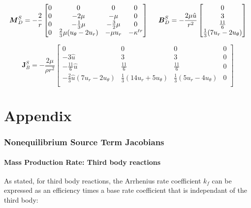 \documentclass[10pt]{article}
\begin{document}
\begin{flushleft}
\begin{equation*}
    \boldsymbol{M}_D^S = -\frac{2}{r}\begin{bmatrix}
        0 & 0 & 0 & 0 \\
        0 & -2 \mu & -\mu & 0 \\
        0 &-\frac{1}{3} \mu & -\frac{3}{2} \mu & 0 \\
        0 & \frac{2}{3} \mu (u_\theta - 2 u_r) & -\mu u_r & -\kappa^{tr} \\
    \end{bmatrix}
    \hspace{5mm}
    \boldsymbol{B}_D^S = -\frac{2 \mu \hat{u}}{r^2} \begin{bmatrix}
        0 \\ 3 \\ \frac{11}{6} \\ \frac{1}{3}(7 u_r - 2 u _\theta)
    \end{bmatrix}
\end{equation*}

\begin{equation*}
    \boldsymbol{J}_B^S = - \frac{2 \mu}{ \rho r^2} \begin{bmatrix}
        0 & 0 & 0 & 0 \\
        -3\hat{u} & 3 & 3 & 0 \\
        -\frac{11}{6} \hat{u} & \frac{11}{6} & \frac{11}{6} & 0 \\
        -\frac{2}{3} \hat{u} (7 u_r - 2 u_\theta) & \frac{1}{3} (14 u_r + 5 u_\theta) & \frac{1}{3} (5 u_r - 4 u_\theta) & 0 \\
    \end{bmatrix}
\end{equation*}


\newpage
\part{Appendix}
\newpage
\appendix

\section{Nonequilibrium Source Term Jacobians}

\subsection{Mass Production Rate: Third body reactions}

As stated, for third body reactions, the Arrhenius rate coefficient $k_f$ can be expressed as an efficiency times a base rate coefficient that is independant of the third body:


\end{flushleft}
\end{document}
